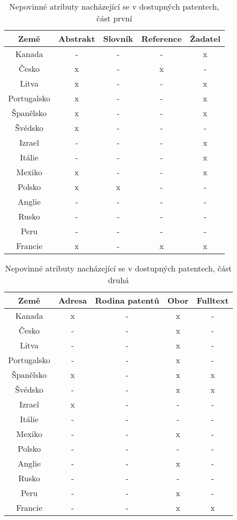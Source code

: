 	\begin{table}[H]
	\centering
	\begin{tabular}{|c|c|c|c|c|} 
	\hline
	\textbf{Země}    & \textbf{Abstrakt} & \textbf{Slovník} & \textbf{Reference} & \textbf{Žadatel} \\
	\hline
	Kanada & - & - & - & x \\
	\hline
	Česko & x & - & x & - \\
	\hline
	Litva & x & - & - & x \\
	\hline
	Portugalsko & x & - & - & x \\
	\hline
	Španělsko & x & - & - & x \\
	\hline
	Švédsko & x & - & - & - \\
	\hline
	Izrael & - & - & - & x \\
	\hline
	Itálie & - & - & - & x \\
	\hline
	Mexiko & x & - & - & x \\
	\hline
	Polsko & x & x & - & - \\
	\hline
	Anglie & - & - & - & - \\
	\hline
	Rusko & - & - & - & - \\
	\hline
	Peru & - & - & - & - \\
	\hline
	Francie & x & - & x & x \\
	\hline
	\end{tabular}
	\caption{Nepovinné atributy nacházející se v dostupných patentech, část první}
	\label{tab:table_attributes_notcrit1}
	\end{table}

	\begin{table}[H]
	\centering
	\begin{tabular}{|c|c|c|c|c|} 
	\hline
	\textbf{Země}    &  \textbf{Adresa} & \textbf{Rodina patentů} & \textbf{Obor} & \textbf{Fulltext} \\
	\hline
	Kanada & x & - & x & - \\
	\hline
	Česko & - & - & x & - \\
	\hline
	Litva & - & - & x & - \\
	\hline
	Portugalsko & - & - & x & - \\
	\hline
	Španělsko & x & - & x & x \\
	\hline
	Švédsko & - & - & x & x \\
	\hline
	Izrael & x & - & - & - \\
	\hline
	Itálie & - & - & - & - \\
	\hline
	Mexiko & - & - & x & - \\
	\hline
	Polsko & - & - & - & - \\
	\hline
	Anglie & - & - & x & - \\
	\hline
	Rusko & - & - & - & - \\
	\hline
	Peru & - & - & x & - \\
	\hline
	Francie & - & - & x & x \\
	\hline
	\end{tabular}
	\caption{Nepovinné atributy nacházející se v dostupných patentech, část druhá}
	\label{tab:table_attributes_notcrit2}
	\end{table}


